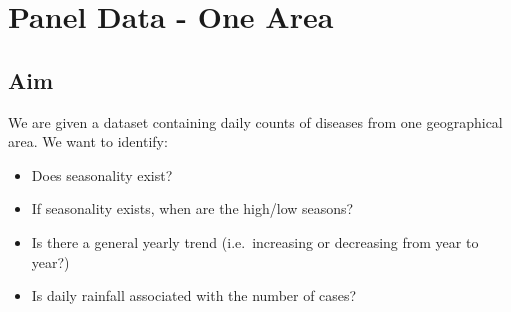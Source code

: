 \documentclass[]{book}
\providecommand{\tightlist}{%
  \setlength{\itemsep}{0pt}\setlength{\parskip}{0pt}}
\begin{document}
\chapter{Panel Data - One Area}\label{panel-data---one-area}

\section{Aim}\label{aim}

We are given a dataset containing daily counts of diseases from one
geographical area. We want to identify:

\begin{itemize}
\tightlist
\item
  Does seasonality exist?
\item
  If seasonality exists, when are the high/low seasons?
\item
  Is there a general yearly trend (i.e.~increasing or decreasing from
  year to year?)
\item
  Is daily rainfall associated with the number of cases?
\end{itemize}
\end{document}
